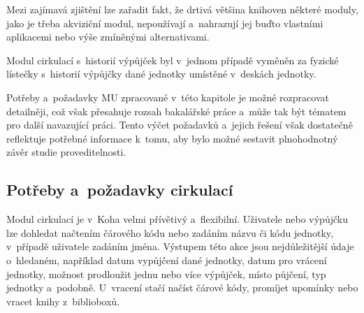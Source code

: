 \documentclass[
	11pt, oneside, printed, final, palatino
	microtype,
	table,   %
	lof,     %
	lot     %
]{fithesis3}
\begin{document}
{Mezi zajímavá zjištění lze zařadit fakt, že drtivá většina knihoven některé moduly, jako je třeba akviziční modul, nepoužívají a~nahrazují jej buďto vlastními aplikacemi nebo výše zmíněnými alternativami.

Modul cirkulací s~historií výpůjček byl v~jednom případě vyměněn za fyzické lístečky s~historií výpůjčky dané jednotky umístěné v~deskách jednotky. 

Potřeby a~požadavky MU zpracované v~této kapitole je možné rozpracovat detailněji, což však přesahuje rozsah bakalářské práce a~může tak být tématem pro další navazující práci. Tento výčet požadavků a~jejich řešení však dostatečně reflektuje potřebné informace k~tomu, aby bylo možné sestavit plnohodnotný závěr studie proveditelnosti.

\subsection{Potřeby a~požadavky cirkulací}

Modul cirkulací je v~Koha velmi přívětivý a~flexibilní. Uživatele nebo výpůjčku lze dohledat načtením čárového kódu nebo zadáním názvu či kódu jednotky, v~případě uživatele zadáním jména. Výstupem této akce jsou nejdůležitější údaje o~hledaném, například datum vypůjčení dané jednotky, datum pro vrácení jednotky, možnost prodloužit jednu nebo více výpůjček, místo půjčení, typ jednotky a~podobně. U~vracení stačí načíst čárové kódy, promíjet upomínky nebo vracet knihy z~biblioboxů.

}
\end{document}
